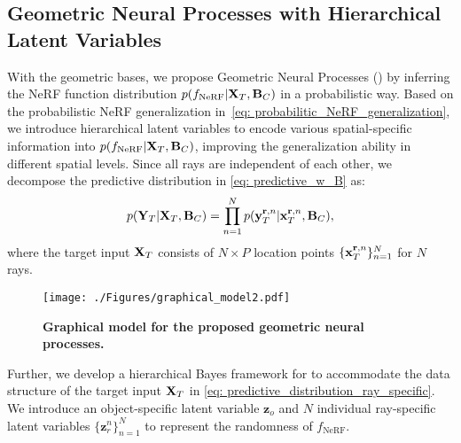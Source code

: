 \subsection{Geometric Neural Processes with Hierarchical Latent Variables}
\label{sec: hierar}

With the geometric bases, we propose Geometric Neural Processes (\textbf{\method{}}) by inferring the NeRF function distribution $p(f_{\text{NeRF}}|{\bf{X}}_{T}, {\bf{{B}}}_{C})$ in a probabilistic way.  
Based on the probabilistic NeRF generalization in~\cref{eq: probabilitic_NeRF_generalization}, we introduce hierarchical latent variables to encode various spatial-specific information into $p(f_{\text{NeRF}}|{\bf{X}}_{T}, {\bf{{B}}}_{C})$, improving the generalization ability in different spatial levels.
Since all rays are independent of each other, we decompose the predictive distribution in \cref{eq: predictive_w_B} as:
\begin{equation}
    p({\bf{Y}}_{T}| {\bf{X}}_{T},  {\bf{B}}_{C})  = \prod_{n=1}^{N} p({\bf{y}}_{T}^{\mathbf{r}, n}| {\bf{x}}_{T}^{{\mathbf{r}}, n},  {\bf{B}}_{C}),
\label{eq: predictive_distribution_ray_specific}
\end{equation}
where the target input ${\bf{X}}_{T}$ consists of $N \times P$ location points $\{{\bf{x}}_{T}^{{\mathbf{r}}, n}\}_{n=1}^{N}$ for $N$ rays.


\begin{figure}[htbp]
\centering
\texttt{[image: ./Figures/graphical\_model2.pdf]} 
\caption{\textbf{Graphical model for the proposed geometric neural processes.}}
\label{fig-supp: graphical_model}
\end{figure}

Further, we develop a hierarchical Bayes framework for \method{} to accommodate the data structure of the target input ${\bf{X}}_{T}$ in \cref{eq: predictive_distribution_ray_specific}.
We introduce an object-specific latent variable $\mathbf{z}_o$ and $N$ individual ray-specific latent variables $\{\mathbf{z}_r^{n}\}_{n=1}^{N}$ to represent the randomness of $f_\text{NeRF}$.


